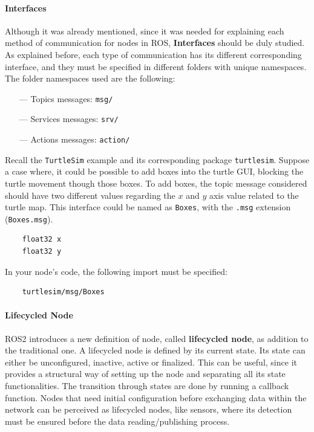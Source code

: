 \paragraph{Interfaces}
               
Although it was already mentioned, since it was needed for explaining each method of communication for nodes in ROS, \textbf{Interfaces} should be duly studied.
As explained before, each type of communication has its different corresponding interface, and they must be specified in different folders with unique namespaces.
The folder namespaces used are the following:
\begin{itemize}
    \item[---]Topics messages: \texttt{msg/}
    \item[---]Services messages: \texttt{srv/}
    \item[---]Actions messages: \texttt{action/}
\end{itemize}
               
Recall the \texttt{TurtleSim} example and its corresponding package \texttt{turtlesim}. Suppose a case where, it could be possible to add boxes into the turtle GUI, blocking the turtle movement though those boxes. To add boxes, the topic message considered should have two different values regarding the $x$ and $y$ axis value related to the turtle map. This interface could be named as \texttt{Boxes}, with the \texttt{.msg} extension (\texttt{Boxes.msg}).
               
\begin{verbatim}
    float32 x
    float32 y
\end{verbatim}

In your node's code, the following import must be specified:

\begin{verbatim}
    turtlesim/msg/Boxes
\end{verbatim}
               
\paragraph{Lifecycled Node}
               
ROS2 introduces a new definition of node, called \textbf{lifecycled node}, as addition to the traditional one. A lifecycled node is defined by its current state. Its state can either be unconfigured, inactive, active or finalized. This can be useful, since it provides a structural way of setting up the node and separating all its state functionalities. The transition through states are done by running a callback function. Nodes that need initial configuration before exchanging data within the network can be perceived as lifecycled nodes, like sensors, where its detection must be ensured before the data reading/publishing process. 
               
